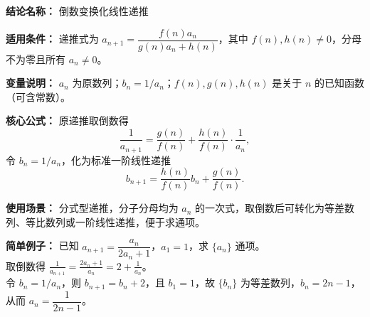 \textbf{结论名称：} 倒数变换化线性递推

\textbf{适用条件：} 递推式为 \(a_{n+1}=\dfrac{f(n)a_n}{g(n)a_n+h(n)}\)，其中 \(f(n),h(n)\neq 0\)，分母不为零且所有 \(a_n\neq 0\)。

\textbf{变量说明：} \(a_n\) 为原数列；\(b_n=1/a_n\)；\(f(n),g(n),h(n)\) 是关于 \(n\) 的已知函数（可含常数）。

\textbf{核心公式：} 原递推取倒数得
\[
\frac{1}{a_{n+1}} = \frac{g(n)}{f(n)} + \frac{h(n)}{f(n)}\cdot\frac{1}{a_n},
\]
令 \(b_n=1/a_n\)，化为标准一阶线性递推
\[
\boxed{b_{n+1} = \frac{h(n)}{f(n)}b_n + \frac{g(n)}{f(n)}}.
\]

\textbf{使用场景：} 分式型递推，分子分母均为 \(a_n\) 的一次式，取倒数后可转化为等差数列、等比数列或一阶线性递推，便于求通项。

\textbf{简单例子：} 已知 \(a_{n+1} = \dfrac{a_n}{2a_n+1}\)，\(a_1=1\)，求 \(\{a_n\}\) 通项。\\
取倒数得 \(\displaystyle\frac{1}{a_{n+1}} = \frac{2a_n+1}{a_n}=2+\frac{1}{a_n}\)。\\
令 \(b_n=1/a_n\)，则 \(b_{n+1}=b_n+2\)，且 \(b_1=1\)，故 \(\{b_n\}\) 为等差数列，\(b_n=2n-1\)，从而 \(a_n=\dfrac{1}{2n-1}\)。